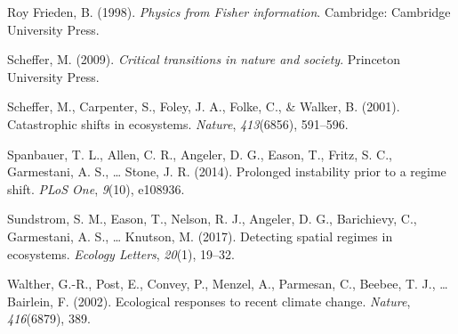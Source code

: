 \documentclass[12pt,twoside]{reedthesis}
\begin{document}
\leavevmode\hypertarget{ref-roy_frieden_physics_1998}{}%
Roy Frieden, B. (1998). \emph{Physics from Fisher information}. Cambridge: Cambridge University Press.

\leavevmode\hypertarget{ref-scheffer_critical_2009}{}%
Scheffer, M. (2009). \emph{Critical transitions in nature and society}. Princeton University Press.

\leavevmode\hypertarget{ref-scheffer_catastrophic_2001}{}%
Scheffer, M., Carpenter, S., Foley, J. A., Folke, C., \& Walker, B. (2001). Catastrophic shifts in ecosystems. \emph{Nature}, \emph{413}(6856), 591--596.

\leavevmode\hypertarget{ref-spanbauer_prolonged_2014}{}%
Spanbauer, T. L., Allen, C. R., Angeler, D. G., Eason, T., Fritz, S. C., Garmestani, A. S., \ldots{} Stone, J. R. (2014). Prolonged instability prior to a regime shift. \emph{PLoS One}, \emph{9}(10), e108936.

\leavevmode\hypertarget{ref-sundstrom_detecting_2017}{}%
Sundstrom, S. M., Eason, T., Nelson, R. J., Angeler, D. G., Barichievy, C., Garmestani, A. S., \ldots{} Knutson, M. (2017). Detecting spatial regimes in ecosystems. \emph{Ecology Letters}, \emph{20}(1), 19--32.

\leavevmode\hypertarget{ref-walther_ecological_2002}{}%
Walther, G.-R., Post, E., Convey, P., Menzel, A., Parmesan, C., Beebee, T. J., \ldots{} Bairlein, F. (2002). Ecological responses to recent climate change. \emph{Nature}, \emph{416}(6879), 389.


\end{document}
